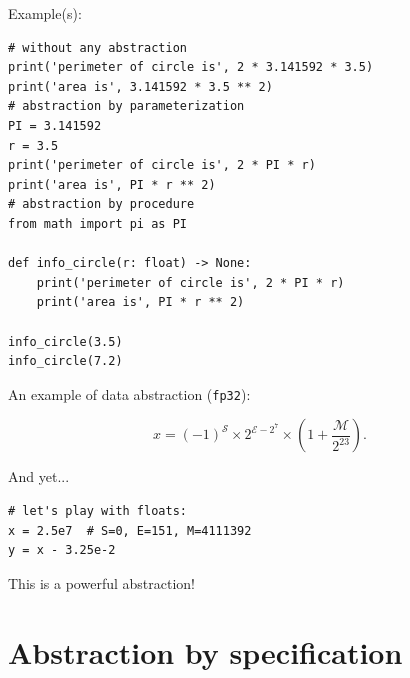 \documentclass[10pt,
aspectratio=169
]{beamer}
\begin{document}
\begin{frame}[fragile]
	Example(s):
	\begin{verbatim}
# without any abstraction
print('perimeter of circle is', 2 * 3.141592 * 3.5)
print('area is', 3.141592 * 3.5 ** 2)
# abstraction by parameterization
PI = 3.141592
r = 3.5
print('perimeter of circle is', 2 * PI * r)
print('area is', PI * r ** 2)
# abstraction by procedure
from math import pi as PI

def info_circle(r: float) -> None:
	print('perimeter of circle is', 2 * PI * r)
	print('area is', PI * r ** 2)

info_circle(3.5)
info_circle(7.2)
\end{verbatim}
\end{frame}


\begin{frame}[fragile]
	An example of data abstraction (\texttt{fp32}):
	\begin{center}
		\begin{equation*}
			x = (-1)^\mathcal{S} \times 2^{\mathcal{E}-2^7} \times \left(1+\frac{\mathcal M}{2^{23}}\right).
		\end{equation*}
	\end{center}
	And yet...
	\begin{verbatim}
# let's play with floats:
x = 2.5e7  # S=0, E=151, M=4111392
y = x - 3.25e-2
	\end{verbatim}
	This is a powerful abstraction!
\end{frame}

\section{Abstraction by specification}
\end{document}
